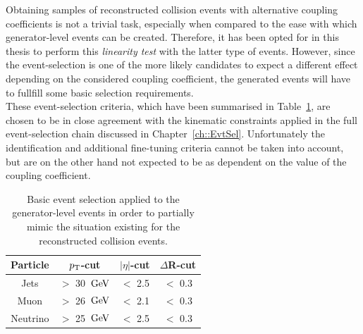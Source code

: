 Obtaining samples of reconstructed collision events with alternative coupling coefficients is not a trivial task, especially when compared to the ease with which generator-level events can be created.
Therefore, it has been opted for in this thesis to perform this \textit{linearity test} with the latter type of events.
However, since the event-selection is one of the more likely candidates to expect a different effect depending on the considered coupling coefficient, the generated events will have to fullfill some basic selection requirements.
\\
These event-selection criteria, which have been summarised in Table~\ref{table::GenCuts}, are chosen to be in close agreement with the kinematic constraints applied in the full event-selection chain discussed in Chapter~\ref{ch::EvtSel}. Unfortunately the identification and additional fine-tuning criteria cannot be taken into account, but are on the other hand not expected to be as dependent on the value of the coupling coefficient.
\begin{table}[h!t]
 \centering
 \caption{Basic event selection applied to the generator-level events in order to partially mimic the situation existing for the reconstructed collision events.} \label{table::GenCuts}
 \renewcommand{\arraystretch}{1.2}
 \begin{tabular}{c|c|c|c}
  Particle 	& $p_{\rm T}$-cut 		& $\vert \eta \vert$-cut 	& $\Delta$R-cut 	\\
  \hline
  Jets 		& $>$ 30 $\, \mathrm{GeV}$ 	& $<$ 2.5			& $<$ 0.3		\\
  Muon		& $>$ 26 $\, \mathrm{GeV}$		& $<$ 2.1			& $<$ 0.3		\\
  Neutrino 	& $>$ 25 $\, \mathrm{GeV}$		& $<$ 2.5			& $<$ 0.3		
 \end{tabular}
\end{table}

